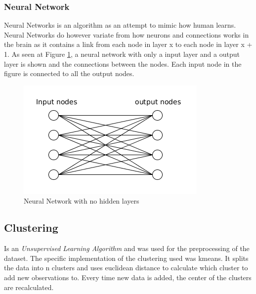 \subsubsection{Neural Network}
Neural Networks is an algorithm as an attempt to mimic how human learns.
Neural Networks do however variate from how neurons and connections works in the brain as it contains a link from each node in layer x to each node in layer x + 1. As seen at Figure \ref{fig:neuralnetwork}, a neural network with only a input layer and a output layer is shown and the connections between the nodes. Each input node in the figure is connected to all the output nodes.

\begin{figure}
  \centering
  \includegraphics[width=0.7\linewidth]{Images/neuralnetwork}
  \caption{Neural Network with no hidden layers}
  \label{fig:neuralnetwork}
\end{figure}

\subsection{Clustering}
Is an \emph{Unsupervised Learning Algorithm} and was used for the preprocessing of the dataset. The specific implementation of the clustering used was kmeans. It splits the data into n clusters and uses euclidean distance to calculate which cluster to add new observations to. Every time new data is added, the center of the clusters are recalculated.